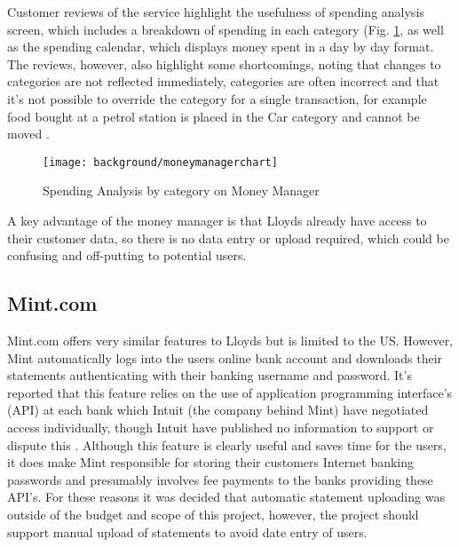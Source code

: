 Customer reviews of the service highlight the usefulness of spending analysis screen, which includes a breakdown of spending in each \gls{category} (Fig. \ref{fig:moneymanager}, as well as the spending calendar, which displays money spent in a day by day format.
%
The reviews, however, also highlight some shortcomings, noting that changes to categories are not reflected immediately, categories are often incorrect and that it's not possible to override the \gls{category} for a single transaction, for example food bought at a petrol station is placed in the Car \gls{category} and cannot be moved \cite{moneywatch2011lloyds, moneysupermarket2011lloyds}.

\begin{figure}[h]
    \centering
    \texttt{[image: background/moneymanagerchart]}
    \caption{Spending Analysis by category on Money Manager \parencite{lloyds2014money}}
    \label{fig:moneymanager}
\end{figure}

A key advantage of the money manager is that Lloyds already have access to their customer data, so there is no data entry or upload required, which could be confusing and off-putting to potential users.

\subsection{Mint.com}
Mint.com offers very similar features to Lloyds but is limited to the US. However, Mint automatically logs into the users online bank account and downloads their statements authenticating with their banking username and password. It's reported that this feature relies on the use of application programming interface's (API) at each bank which Intuit (the company behind Mint) have negotiated access individually, though Intuit have published no information to support or dispute this \cite{stackoverflow2012bankingapi, stackoverflow2012bankingapi2}.
% 
Although this feature is clearly useful and saves time for the users, it does make Mint responsible for storing their customers Internet banking passwords and presumably involves fee payments to the banks providing these API's.  
%
For these reasons it was decided that automatic statement uploading was outside of the budget and scope of this project, however, the project should support manual upload of statements to avoid date entry of users.  


